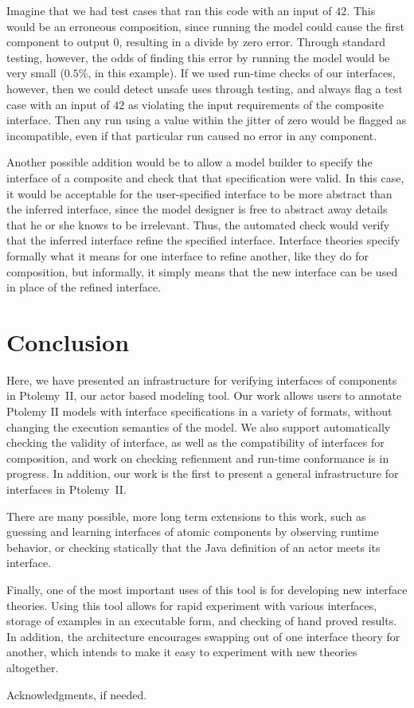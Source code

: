 \documentclass[preprint,11pt]{sigplanconf}
\begin{document}
Imagine that we had test cases that ran this code with an input of $42$.
This would be an erroneous composition, since running the model could cause
the first component to output $0$, resulting in a divide by zero error.
Through standard testing, however, the odds of finding this error by running
the model would be very small ($0.5\%$, in this example). If we used run-time
checks of our interfaces, however, then we could detect unsafe uses through
testing, and always flag a test case with an input of $42$ as violating the
input requirements of the composite interface. Then any run using a value
within the jitter of zero would be flagged as incompatible, even if that
particular run caused no error in any component.

Another possible addition would be to allow a model builder to specify the
interface of a composite and check that that specification were valid.
In this case, it would be acceptable for the user-specified interface to be
more abstract than the inferred interface, since the model designer is free to
abstract away details that he or she knows to be irrelevant. Thus, the
automated check would verify that the inferred interface refine the specified
interface. Interface theories specify formally what it means for one interface
to refine another, like they do for composition, but informally, it simply
means that the new interface can be used in place of the refined interface.

\section{Conclusion}
Here, we have presented an infrastructure for verifying interfaces of
components in Ptolemy~II, our actor based modeling tool. Our work
allows users to annotate Ptolemy II models with interface specifications in a
variety of formats, without changing the execution semantics of the model.
We also support automatically checking the validity of interface, as well as the
compatibility of interfaces for composition, and work on checking refienment
and run-time conformance is in progress. In addition, our work is the first to
present a general infrastructure for interfaces in Ptolemy~II.

There are many possible, more long term extensions to this work, such as
guessing and learning interfaces of atomic components by observing runtime
behavior, or checking statically that the Java definition of an actor meets
its interface.

Finally, one of the most important uses of this tool is for developing new
interface theories. Using this tool allows for rapid experiment with various
interfaces, storage of examples in an executable form, and checking of hand
proved results. In addition, the architecture encourages swapping out of one
interface theory for another, which intends to make it easy to experiment with
new theories altogether.

\acks

Acknowledgments, if needed.




\end{document}
